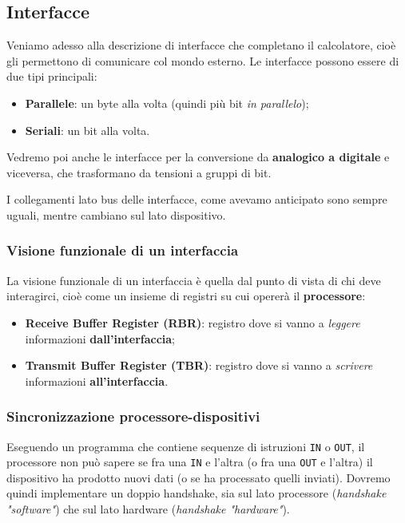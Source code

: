 \documentclass[a4paper,11pt]{article}
\begin{document}
\subsection{Interfacce}
Veniamo adesso alla descrizione di interfacce che completano il calcolatore, cioè gli permettono di comunicare col mondo esterno.
Le interfacce possono essere di due tipi principali:
\begin{itemize}
	\item \textbf{Parallele}: un byte alla volta (quindi più bit \textit{in parallelo});
	\item \textbf{Seriali}: un bit alla volta.
\end{itemize}
Vedremo poi anche le interfacce per la conversione da \textbf{analogico a digitale} e viceversa, che trasformano da tensioni a gruppi di bit.

I collegamenti lato bus delle interfacce, come avevamo anticipato sono sempre uguali, mentre cambiano sul lato dispositivo.

\subsubsection{Visione funzionale di un interfaccia}
La visione funzionale di un interfaccia è quella dal punto di vista di chi deve interagirci, cioè come un insieme di registri su cui opererà il \textbf{processore}:
\begin{itemize}
	\item \textbf{Receive Buffer Register (RBR)}: registro dove si vanno a \textit{leggere} informazioni \textbf{dall'interfaccia};
	\item \textbf{Transmit Buffer Register (TBR)}: registro dove si vanno a \textit{scrivere} informazioni \textbf{all'interfaccia}.
\end{itemize}

\subsubsection{Sincronizzazione processore-dispositivi}
Eseguendo un programma che contiene sequenze di istruzioni \lstinline|IN| o \lstinline|OUT|, il processore non può sapere se fra una \lstinline|IN| e l'altra (o fra una \lstinline|OUT| e l'altra) il dispositivo ha prodotto nuovi dati (o se ha processato quelli inviati).
Dovremo quindi implementare un doppio handshake, sia sul lato processore (\textit{handshake "software"}) che sul lato hardware (\textit{handshake "hardware"}).

\par\smallskip 
\end{document}
